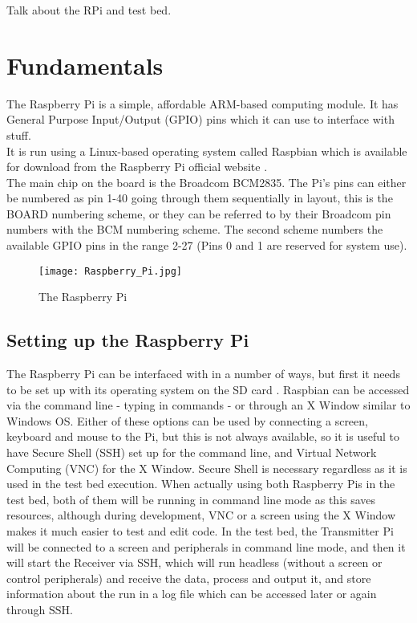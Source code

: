 \documentclass[../main.tex]{subfiles}
\begin{document}
Talk about the RPi and test bed.


\section{Fundamentals}

The Raspberry Pi is a simple, affordable ARM-based computing module. It has General Purpose Input/Output (GPIO) pins which it can use to interface with stuff.\\

It is run using a Linux-based operating system called Raspbian which is available for download from the Raspberry Pi official website \cite{lib_Raspbian}.\\

The main chip on the board is the Broadcom BCM2835.
The Pi's pins can either be numbered as pin 1-40 going through them sequentially in layout, this is the BOARD numbering scheme, or they can be referred to by their Broadcom pin numbers with the BCM numbering scheme.
The second scheme numbers the available GPIO pins in the range 2-27 (Pins 0 and 1 are reserved for system use).


\begin{figure}[ht]
	\centering
	\texttt{[image: Raspberry\_Pi.jpg]}
	\caption{The Raspberry Pi}
\end{figure}

\subsection{Setting up the Raspberry Pi}

The Raspberry Pi can be interfaced with in a number of ways, but first it needs to be set up with its operating system on the SD card \cite{web_SetupRaspbian}.
Raspbian can be accessed via the command line - typing in commands - or through an X Window similar to Windows OS.
Either of these options can be used by connecting a screen, keyboard and mouse to the Pi, but this is not always available, so it is useful to have Secure Shell (SSH) set up for the command line, and Virtual Network Computing (VNC) for the X Window.
Secure Shell is necessary regardless as it is used in the test bed execution.
When actually using both Raspberry Pis in the test bed, both of them will be running in command line mode as this saves resources, although during development, VNC or a screen using the X Window makes it much easier to test and edit code.
In the test bed, the Transmitter Pi will be connected to a screen and peripherals in command line mode, and then it will start the Receiver via SSH, which will run headless (without a screen or control peripherals) and receive the data, process and output it, and store information about the run in a log file which can be accessed later or again through SSH.\\
\end{document}
